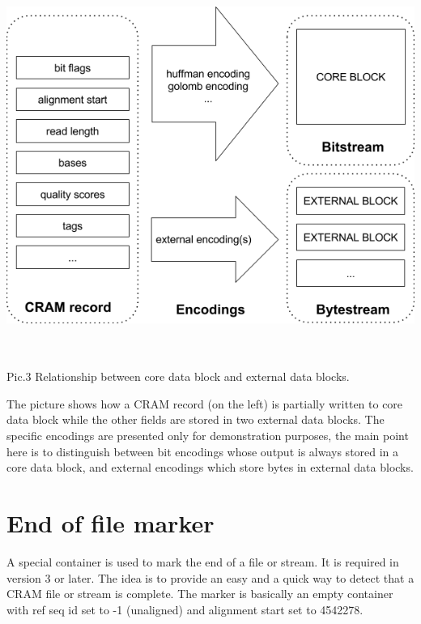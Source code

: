 \documentclass[a4paper]{article}
\begin{document}
\includegraphics[width=451pt, height=350pt, keepaspectratio=true]{img/CRAMFileFormat2-1-fig007.png}

Pic.3 Relationship between core data block and external data blocks.

The picture shows how a CRAM record (on the left) is partially written to core 
data block while the other fields are stored in two external data blocks. The specific 
encodings are presented only for demonstration purposes, the main point here is 
to distinguish between bit encodings whose output is always stored in a core data 
block, and external encodings which store bytes in external data blocks.

\section{\textbf{End of file marker}}

A special container is used to mark the end of a file or stream. It is required in version 3 or later. The idea is to provide an easy and a quick way to detect that a CRAM file or stream is complete. The marker is basically an empty container with ref seq id set to -1 (unaligned) and alignment 
start set to 4542278.
\end{document}
